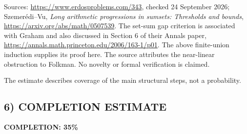 Sources: \url{https://www.erdosproblems.com/343}, checked 24 September 2026; Szemer\'edi--Vu, \emph{Long arithmetic progressions in sumsets: Thresholds and bounds}, \url{https://arxiv.org/abs/math/0507539}. The set-sum gap criterion is associated with Graham and also discussed in Section 6 of their Annals paper, \url{https://annals.math.princeton.edu/2006/163-1/p01}. The above finite-union induction supplies its proof here. The source attributes the near-linear obstruction to Folkman. No novelty or formal verification is claimed.

The estimate describes coverage of the main structural steps, not a probability.
\subsection*{6) COMPLETION ESTIMATE}
\textbf{COMPLETION: 35\%}
